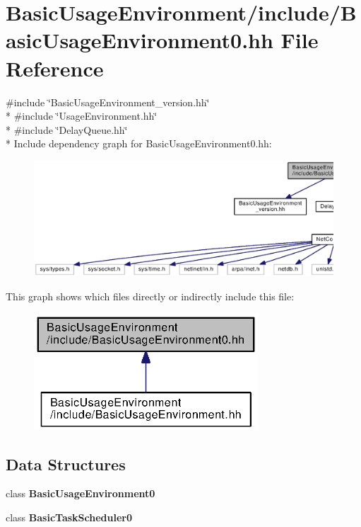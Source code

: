 \section{Basic\+Usage\+Environment/include/\+Basic\+Usage\+Environment0.hh File Reference}
\label{BasicUsageEnvironment0_8hh}
{\ttfamily \#include \char`\"{}Basic\+Usage\+Environment\+\_\+version.\+hh\char`\"{}}\\*
{\ttfamily \#include \char`\"{}Usage\+Environment.\+hh\char`\"{}}\\*
{\ttfamily \#include \char`\"{}Delay\+Queue.\+hh\char`\"{}}\\*
Include dependency graph for Basic\+Usage\+Environment0.\+hh\+:
\nopagebreak
\begin{figure}[H]
\begin{center}
\leavevmode
\includegraphics[width=350pt]{BasicUsageEnvironment0_8hh__incl}
\end{center}
\end{figure}
This graph shows which files directly or indirectly include this file\+:
\nopagebreak
\begin{figure}[H]
\begin{center}
\leavevmode
\includegraphics[width=238pt]{BasicUsageEnvironment0_8hh__dep__incl}
\end{center}
\end{figure}
\subsection*{Data Structures}
\begin{DoxyCompactItemize}
\item 
class {\bf Basic\+Usage\+Environment0}
\item 
class {\bf Basic\+Task\+Scheduler0}
\end{DoxyCompactItemize}
